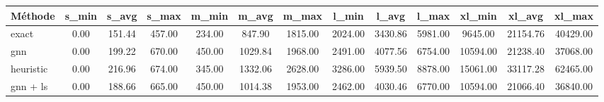 \begin{tabular}{lcccccccccccc}
\toprule
Méthode & s_min & s_avg & s_max & m_min & m_avg & m_max & l_min & l_avg & l_max & xl_min & xl_avg & xl_max \\
\midrule
exact & 0.00 & 151.44 & 457.00 & 234.00 & 847.90 & 1815.00 & 2024.00 & 3430.86 & 5981.00 & 9645.00 & 21154.76 & 40429.00 \\
gnn & 0.00 & 199.22 & 670.00 & 450.00 & 1029.84 & 1968.00 & 2491.00 & 4077.56 & 6754.00 & 10594.00 & 21238.40 & 37068.00 \\
heuristic & 0.00 & 216.96 & 674.00 & 345.00 & 1332.06 & 2628.00 & 3286.00 & 5939.50 & 8878.00 & 15061.00 & 33117.28 & 62465.00 \\
gnn + ls & 0.00 & 188.66 & 665.00 & 450.00 & 1014.38 & 1953.00 & 2462.00 & 4030.46 & 6770.00 & 10594.00 & 21066.40 & 36840.00 \\
\bottomrule
\end{tabular}
